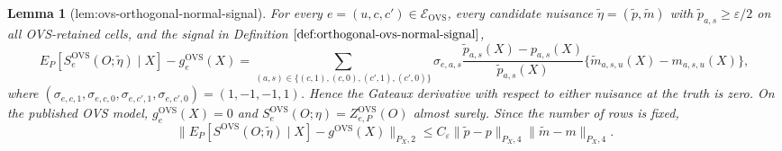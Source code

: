 \documentclass{article}
\newtheorem{lemma}{Lemma}
\begin{document}
\begin{lemma}[lem:ovs-orthogonal-normal-signal]\label{lem:ovs-orthogonal-normal-signal}
For every \(e=(u,c,c')\in\mathcal E_{\mathrm{OVS}}\), every candidate nuisance \(\widetilde\eta=(\widetilde p,\widetilde m)\) with \(\widetilde p_{a,s}\ge\varepsilon/2\) on all OVS-retained cells, and the signal in Definition \(\ref{def:orthogonal-ovs-normal-signal}\),
\[
E_P[S_e^{\mathrm{OVS}}(O;\widetilde\eta)\mid X]-g_e^{\mathrm{OVS}}(X)
=\sum_{(a,s)\in\{(c,1),(c,0),(c',1),(c',0)\}}
\sigma_{e,a,s}\frac{\widetilde p_{a,s}(X)-p_{a,s}(X)}{\widetilde p_{a,s}(X)}
\{\widetilde m_{a,s,u}(X)-m_{a,s,u}(X)\},
\tag{35}
\]
where \((\sigma_{e,c,1},\sigma_{e,c,0},\sigma_{e,c',1},\sigma_{e,c',0})=(1,-1,-1,1)\).  Hence the Gateaux derivative with respect to either nuisance at the truth is zero.  On the published OVS model, \(g_e^{\mathrm{OVS}}(X)=0\) and \(S_e^{\mathrm{OVS}}(O;\eta)=Z_{e,P}^{\mathrm{OVS}}(O)\) almost surely.  Since the number of rows is fixed,
\[
\|E_P[S^{\mathrm{OVS}}(O;\widetilde\eta)\mid X]-g^{\mathrm{OVS}}(X)\|_{P_X,2}
\le C_\varepsilon
\|\widetilde p-p\|_{P_X,4}\|\widetilde m-m\|_{P_X,4}.
\tag{36}
\]
\end{lemma}
\end{document}
